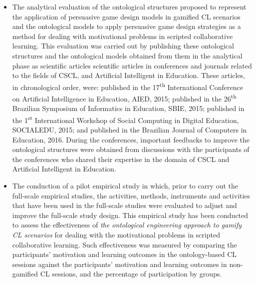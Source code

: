 \begin{description}
\begin{itemize}
\item
The analytical evaluation of the ontological structures proposed to represent the application of persuasive game design models in gamified CL scenarios and the ontological models to apply persuasive game design strategies as a method for dealing with motivational problems in scripted collaborative learning.
This evaluation was carried out by publishing these ontological structures and the ontological models obtained from them in the analytical phase as scientific articles scientific articles in conferences and journals related to the fields of CSCL, and Artificial Intelligent in Education.
These articles, in chronological order, were:
 published in the 17\textsuperscript{th} International Conference on Artificial Intelligence in Education, AIED, 2015;
 published in the 26\textsuperscript{th} Brazilian Symposium of Informatics in Education, SBIE, 2015;
 published in the 1\textsuperscript{st} International Workshop of Social Computing in Digital Education, SOCIALEDU, 2015; and
 published in the Brazilian Journal of Computers in Education, 2016.
During the conferences, important feedbacks to improve the ontological structures were obtained from discussions with the participants of the conferences who shared their expertise in the domain of CSCL and Artificial Intelligent in Education.

\item
The conduction of a pilot empirical study in which, prior to carry out the full-scale empirical studies, the activities, methods, instruments and activities that have been used in the full-scale studies were evaluated to adjust and improve the full-scale study design.
This empirical study has been conducted to assess the effectiveness of \emph{the ontological engineering approach to gamify CL scenarios} for dealing with the motivational problems in scripted collaborative learning.
Such effectiveness was measured by comparing the participants' motivation and learning outcomes in the ontology-based CL sessions against the participants' motivation and learning outcomes in non-gamified CL sessions, and the percentage of participation by groups.


\end{itemize}
\end{description}
